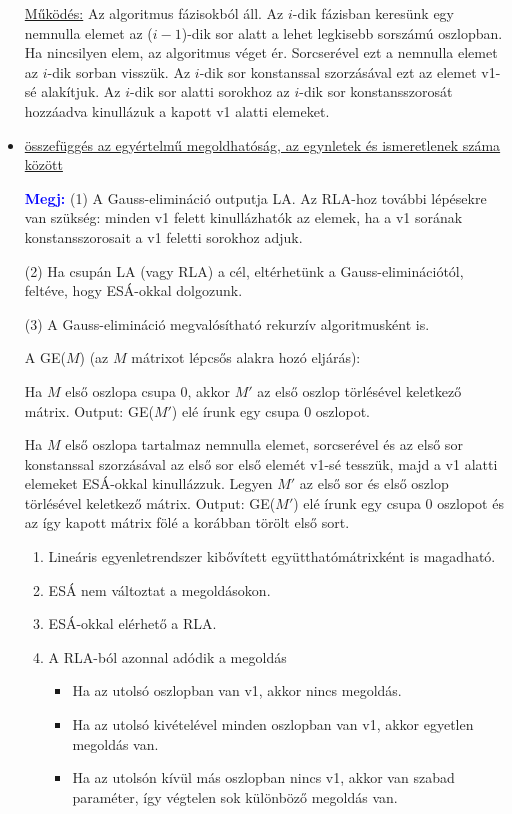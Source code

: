 \documentclass[../../szobeli.tex]{subfiles}
\begin{document}
\begin{itemize}
            \underline{Működés:} Az algoritmus fázisokból áll. Az $i$-dik fázisban keresünk egy nemnulla elemet az ($i-1$)-dik sor alatt a lehet legkisebb sorszámú oszlopban. Ha nincsilyen elem, az algoritmus véget ér. Sorcserével ezt a nemnulla elemet az $i$-dik sorban visszük. Az $i$-dik sor konstanssal szorzásával ezt az elemet v1-sé alakítjuk. Az $i$-dik sor alatti sorokhoz az $i$-dik sor konstansszorosát hozzáadva kinullázuk a kapott v1 alatti elemeket.

        \item \underline{összefüggés az egyértelmű megoldhatóság, az egynletek és ismeretlenek száma között}
        
            \textcolor{blue}{\textbf{Megj:}} (1) A Gauss-elimináció outputja LA. Az RLA-hoz további lépésekre van szükség: minden v1 felett kinullázhatók az elemek, ha a v1 sorának konstansszorosait a v1 feletti sorokhoz adjuk. 

            (2) Ha csupán LA (vagy RLA) a cél, eltérhetünk a Gauss-eliminációtól, feltéve, hogy ESÁ-okkal dolgozunk.

            (3) A Gauss-elimináció megvalósítható rekurzív algoritmusként is. 

            A GE($M$) (az $M$ mátrixot lépcsős alakra hozó eljárás):

             Ha $M$ első oszlopa csupa 0, akkor $M'$ az első oszlop törlésével keletkező mátrix. Output: GE($M'$) elé írunk egy csupa 0 oszlopot.

             Ha $M$ első oszlopa tartalmaz nemnulla elemet, sorcserével és az első sor konstanssal szorzásával az első sor első elemét v1-sé tesszük, majd a v1 alatti elemeket ESÁ-okkal kinullázzuk. Legyen $M'$ az első sor és első oszlop törlésével keletkező mátrix. Output: GE($M'$) elé írunk egy csupa 0 oszlopot és az így kapott mátrix fölé a korábban törölt első sort.

            \begin{enumerate}
                \item Lineáris egyenletrendszer kibővített együtthatómátrixként is magadható.
                \item ESÁ nem változtat a megoldásokon.
                \item ESÁ-okkal elérhető a RLA.
                \item A RLA-ból azonnal adódik a megoldás \begin{itemize}
                    \item Ha az utolsó oszlopban van v1, akkor nincs megoldás.
                    \item Ha az utolsó kivételével minden oszlopban van v1, akkor egyetlen megoldás van.
                    \item Ha az utolsón kívül más oszlopban nincs v1, akkor van szabad paraméter, így végtelen sok különböző megoldás van.
                \end{itemize}
            \end{enumerate}


\end{itemize}
\end{document}
